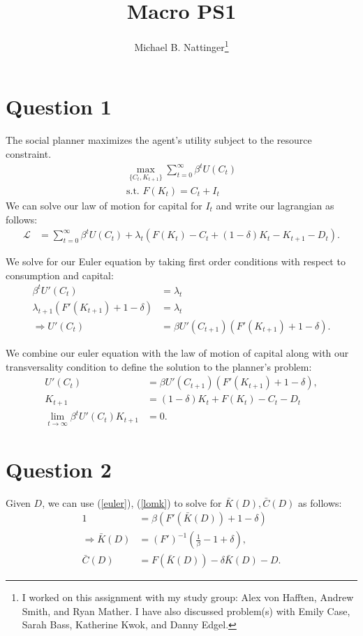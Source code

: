 \documentclass[11pt]{article} %
\title{Macro PS1}
\author{Michael B. Nattinger\footnote{I worked on this assignment with my study group: Alex von Hafften, Andrew Smith, and Ryan Mather. I have also discussed problem(s) with Emily Case, Sarah Bass, Katherine Kwok, and Danny Edgel.}}
\begin{document}
\maketitle
\section{Question 1}
The social planner maximizes the agent's utility subject to the resource constraint. 
\begin{align*}
\max_{\{C_t,K_{t+1}\} }\sum_{t=0}^{\infty} \beta^t U(C_t)\\
\text{s.t. } F(K_t) = C_t + I_t
\end{align*}
 We can solve our law of motion for capital for $I_t$ and write our lagrangian as follows:
\begin{align*}
\mathcal{L} &= \sum_{t=0}^{\infty} \beta^t U(C_t) + \lambda_t(F(K_t) - C_t + (1-\delta)K_t - K_{t+1} - D_t).
\end{align*}

We solve for our Euler equation by taking first order conditions with respect to consumption and capital:
\begin{align*}
\beta^t U'(C_t) &= \lambda_t\\
\lambda_{t+1} (F'(K_{t+1}) + 1-\delta) &= \lambda_t \\
\Rightarrow U'(C_t) &= \beta U'(C_{t+1}) (F'(K_{t+1}) + 1-\delta).
\end{align*}

We combine our euler equation with the law of motion of capital along with our transversality condition to define the solution to the planner's problem:
\begin{align}
U'(C_t) &= \beta U'(C_{t+1}) (F'(K_{t+1}) + 1-\delta), \label{euler}\\
K_{t+1} &= (1-\delta) K_t + F(K_t) - C_t - D_t \label{lomk}\\
\lim_{t\rightarrow \infty} \beta^t U'(C_{t}) K_{t+1} &= 0. \label{tvc}
\end{align}

\section{Question 2}
Given $D$, we can use (\ref{euler}), (\ref{lomk}) to solve for $\bar{K}(D),\bar{C}(D)$ as follows:
\begin{align*}
1 &= \beta  (F'(\bar{K}(D)) + 1-\delta)\\
\Rightarrow \bar{K}(D)&= (F')^{-1}\left(\frac{1}{\beta} -1 +\delta\right),\\
\bar{C}(D) &= F(\bar{K}(D)) - \delta\bar{K}(D) - D.
\end{align*}
\end{document}
